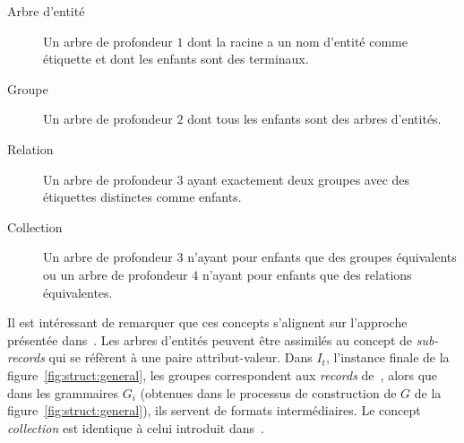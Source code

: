 \begin{description}
    \item[Arbre d'entité] Un arbre de profondeur $1$ dont la racine a un nom d'entité comme étiquette et dont les enfants sont des terminaux.

    \item[Groupe] Un arbre de profondeur $2$ dont tous les enfants sont des arbres d'entités.

    \item[Relation] Un arbre de profondeur $3$ ayant exactement deux groupes avec des étiquettes distinctes comme enfants.

    \item[Collection] Un arbre de profondeur $3$ n'ayant pour enfants que des groupes équivalents ou un arbre de profondeur $4$ n'ayant pour enfants que des relations équivalentes.
\end{description}

Il est intéressant de remarquer que ces concepts s'alignent sur l'approche présentée dans~\cite{barretAbstraGenericAbstractions2022}.
Les arbres d'entités peuvent être assimilés au concept de \emph{sub-records} qui se réfèrent à une paire attribut-valeur.
Dans $I_t$, l'instance finale de la figure~\ref{fig:struct:general}, les groupes correspondent aux \emph{records} de~\cite{barretAbstraGenericAbstractions2022}, alors que dans les grammaires $G_i$ (obtenues dans le processus de construction de $G$ de la figure~\ref{fig:struct:general}), ils servent de formats intermédiaires.
Le concept \textit{collection} est identique à celui introduit dans~\cite{barretAbstraGenericAbstractions2022}.

